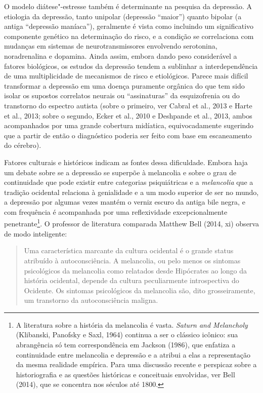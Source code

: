 O modelo diátese"-estresse também é determinante na pesquisa da
depressão. A etiologia da depressão, tanto unipolar (depressão
``maior'') quanto bipolar (a antiga ``depressão maníaca''), geralmente é
vista como incluindo um significativo componente genético na
determinação do risco, e a condição se correlaciona com mudanças em
sistemas de neurotransmissores envolvendo serotonina, noradrenalina e
dopamina. Ainda assim, embora dando peso considerável a fatores
biológicos, os estudos da depressão tendem a sublinhar a
interdependência de uma multiplicidade de mecanismos de risco e
etiológicos. Parece mais difícil transformar a depressão em uma doença
puramente orgânica do que tem sido isolar os supostos correlatos neurais
ou ``assinaturas'' da esquizofrenia ou do transtorno do espectro autista
(sobre o primeiro, ver Cabral et al., 2013 e Harte et al., 2013; sobre o
segundo, Ecker et al., 2010 e Deshpande et al., 2013, ambos acompanhados
por uma grande cobertura midíatica, equivocadamente sugerindo que a
partir de então o diagnóstico poderia ser feito com base em escaneamento
do cérebro).

Fatores culturais e históricos indicam as fontes dessa dificuldade.
Embora haja um debate sobre se a depressão se superpõe à melancolia e
sobre o grau de continuidade que pode existir entre categorias
psiquiátricas e a \emph{melancolia} que a tradição ocidental relaciona à
genialidade e a um modo superior de ser no mundo, a depressão por
algumas vezes mantém o verniz escuro da antiga bile negra, e com
frequência é acompanhada por uma reflexividade excepcionalmente
penetrante\footnote[5]{A literatura sobre a história da melancolia é vasta. \emph{Saturn
and Melancholy} (Klibanski, Panofsky e Saxl, 1964) continua a ser o
clássico icônico: sua abrangência só tem correspondência em Jackson
(1986), que enfatiza a continuidade entre melancolia e depressão e a
atribui a elas a representação da mesma realidade empírica. Para uma
discussão recente e perspicaz sobre a historiografia e as questões
históricas e conceituais envolvidas, ver Bell (2014), que se concentra
nos séculos até 1800.}. O professor de literatura comparada
Matthew Bell (2014, xi) observa de modo inteligente:

\begin{quote}
Uma característica marcante da cultura ocidental é o grande status
atribuído à autoconsciência. A melancolia, ou pelo menos os sintomas
psicológicos da melancolia como relatados desde Hipócrates ao longo da
história ocidental, depende da cultura peculiarmente introspectiva do
Ocidente. Os sintomas psicológicos da melancolia são, dito
grosseiramente, um transtorno da autoconsciência maligna.
\end{quote}

